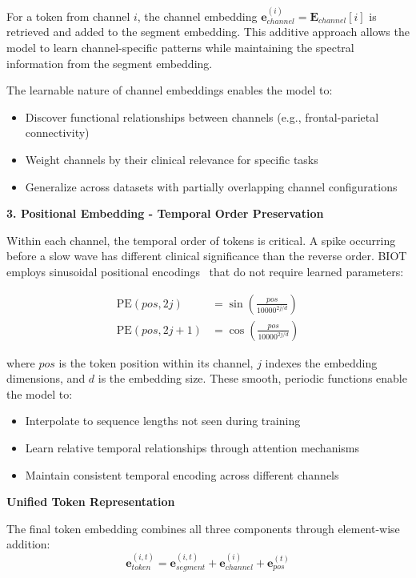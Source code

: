 For a token from channel $i$, the channel embedding $\mathbf{e}_{channel}^{(i)} = \mathbf{E}_{channel}[i]$ is retrieved and added to the segment embedding. This additive approach allows the model to learn channel-specific patterns while maintaining the spectral information from the segment embedding.

The learnable nature of channel embeddings enables the model to:
\begin{itemize}
    \item Discover functional relationships between channels (e.g., frontal-parietal connectivity)
    \item Weight channels by their clinical relevance for specific tasks
    \item Generalize across datasets with partially overlapping channel configurations
\end{itemize}

\textbf{3. Positional Embedding - Temporal Order Preservation}

Within each channel, the temporal order of tokens is critical. A spike occurring before a slow wave has different clinical significance than the reverse order. \ac{BIOT} employs sinusoidal positional encodings~\cite{vaswani2017attention} that do not require learned parameters:

\begin{align}
\text{PE}(pos, 2j) &= \sin\left(\frac{pos}{10000^{2j/d}}\right) \\
\text{PE}(pos, 2j+1) &= \cos\left(\frac{pos}{10000^{2j/d}}\right)
\end{align}

where $pos$ is the token position within its channel, $j$ indexes the embedding dimensions, and $d$ is the embedding size. These smooth, periodic functions enable the model to:
\begin{itemize}
    \item Interpolate to sequence lengths not seen during training
    \item Learn relative temporal relationships through attention mechanisms
    \item Maintain consistent temporal encoding across different channels
\end{itemize}

\textbf{Unified Token Representation}

The final token embedding combines all three components through element-wise addition:
$$\mathbf{e}_{token}^{(i,t)} = \mathbf{e}_{segment}^{(i,t)} + \mathbf{e}_{channel}^{(i)} + \mathbf{e}_{pos}^{(t)}$$

